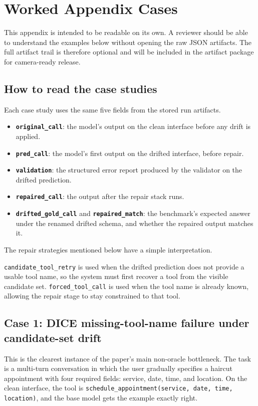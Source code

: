 \documentclass{svproc}
\newcommand{\artifactrepolink}{artifact package for camera-ready release}
\begin{document}
\clearpage
\appendix
\renewcommand{\theHsection}{app.\Alph{section}}
\section{Worked Appendix Cases}
\label{app:artifact-guide}
This appendix is intended to be readable on its own. A reviewer should be able
to understand the examples below without opening the raw JSON artifacts. The
full artifact trail is therefore optional and will be included in the
\artifactrepolink{}.

\subsection{How to read the case studies}
Each case study uses the same five fields from the stored run artifacts.
\begin{itemize}
\item \textbf{\texttt{original\_call}}: the model's output on the clean interface
before any drift is applied.
\item \textbf{\texttt{pred\_call}}: the model's first output on the drifted
interface, before repair.
\item \textbf{\texttt{validation}}: the structured error report produced by the
validator on the drifted prediction.
\item \textbf{\texttt{repaired\_call}}: the output after the repair stack runs.
\item \textbf{\texttt{drifted\_gold\_call}} and \textbf{\texttt{repaired\_match}}:
the benchmark's expected answer under the renamed drifted schema, and whether
the repaired output matches it.
\end{itemize}

The repair strategies mentioned below have a simple interpretation.

\noindent\texttt{candidate\_tool\_retry} is used when the drifted prediction does not
provide a usable tool name, so the system must first recover a tool from the
visible candidate set. \texttt{forced\_tool\_call} is used when the tool name is
already known, allowing the repair stage to stay constrained to that tool.

\subsection{Case 1: DICE missing-tool-name failure under candidate-set drift}
\label{app:dice-missing-tool}
This is the clearest instance of the paper's main non-oracle bottleneck. The
task is a multi-turn conversation in which the user gradually specifies a
haircut appointment with four required fields: service, date, time, and
location. On the clean interface, the tool is
\texttt{schedule\_appointment(service, date, time, location)}, and the base
model gets the example exactly right.
\end{document}
